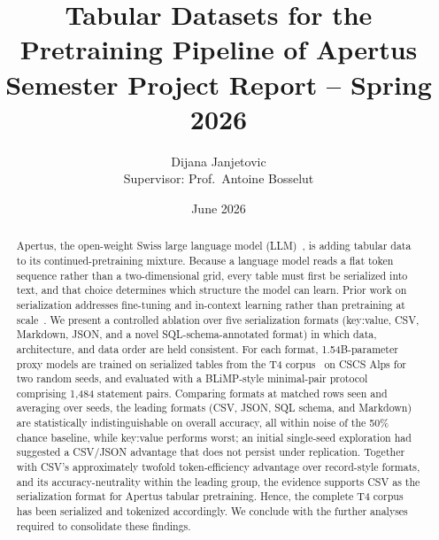 \documentclass[11pt,a4paper]{article}
\title{\textbf{Tabular Datasets for the Pretraining Pipeline of Apertus}\\[1ex]
\large Semester Project Report -- Spring 2026}
\author{Dijana Janjetovic\\[0.5ex]
\small Supervisor: Prof.\ Antoine Bosselut}
\date{June 2026}
\begin{document}
\maketitle
\begin{abstract}
\noindent
Apertus, the open-weight Swiss large language model (LLM)~\cite{apertus}, is adding tabular data to its continued-pretraining mixture. Because a language model reads a flat token sequence rather than a two-dimensional grid, every table must first be serialized into text, and that choice determines which structure the model can learn. Prior work on serialization addresses fine-tuning and in-context learning rather than pretraining at scale~\cite{tabllm,jaitly,wang,wu2025}. We present a controlled ablation over five serialization formats (key:value, CSV, Markdown, JSON, and a novel SQL-schema-annotated format) in which data, architecture, and data order are held consistent. For each format, 1.54B-parameter proxy models are trained on serialized tables from the T4 corpus~\cite{t4} on CSCS Alps for two random seeds, and evaluated with a BLiMP-style minimal-pair protocol~\cite{blimp} comprising 1{,}484 statement pairs. Comparing formats at matched rows seen and averaging over seeds, the leading formats (CSV, JSON, SQL schema, and Markdown) are statistically indistinguishable on overall accuracy, all within noise of the 50\% chance baseline, while key:value performs worst; an initial single-seed exploration had suggested a CSV/JSON advantage that does not persist under replication. Together with CSV's approximately twofold token-efficiency advantage over record-style formats, and its accuracy-neutrality within the leading group, the evidence supports CSV as the serialization format for Apertus tabular pretraining. Hence, the complete T4 corpus has been serialized and tokenized accordingly. We conclude with the further analyses required to consolidate these findings.
\end{abstract}
\end{document}
